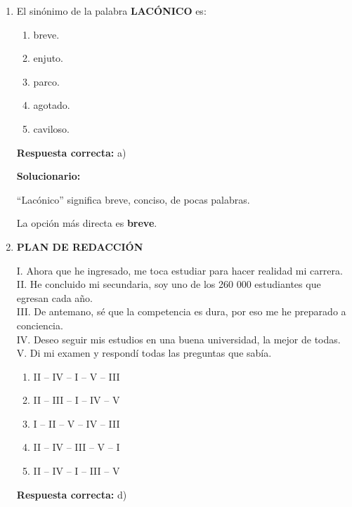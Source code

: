 \begin{enumerate}[resume]
	\vspace{2mm}
	\textbf{Solucionario:}
	
	``Alevosía'' se relaciona con traición o perfidia; su antónimo es \textbf{lealtad}.
	

	
	\vspace{6mm}
	
	\item El sinónimo de la palabra \textbf{LACÓNICO} es:
	\begin{enumerate}[label=\alph*)]
		\item breve.
		\item enjuto.
		\item parco.
		\item agotado.
		\item caviloso.
	\end{enumerate}
	\textbf{Respuesta correcta:} a)
	
	\vspace{2mm}
	\textbf{Solucionario:}
	
	``Lacónico'' significa breve, conciso, de pocas palabras.
	
	La opción más directa es \textbf{breve}.
	

	
	\vspace{6mm}
	
	\item \textbf{PLAN DE REDACCIÓN}
	
	I. Ahora que he ingresado, me toca estudiar para hacer realidad mi carrera.\\
	II. He concluido mi secundaria, soy uno de los 260 000 estudiantes que egresan cada año.\\
	III. De antemano, sé que la competencia es dura, por eso me he preparado a conciencia.\\
	IV. Deseo seguir mis estudios en una buena universidad, la mejor de todas.\\
	V. Di mi examen y respondí todas las preguntas que sabía.
	
	\begin{enumerate}[label=\alph*)]
		\item II -- IV -- I -- V -- III
		\item II -- III -- I -- IV -- V
		\item I -- II -- V -- IV -- III
		\item II -- IV -- III -- V -- I
		\item II -- IV -- I -- III -- V
	\end{enumerate}
	\textbf{Respuesta correcta:} d)
	

\end{enumerate}
